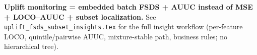 
\noindent\textbf{Uplift monitoring = embedded batch FSDS + AUUC instead of MSE + LOCO--AUUC + subset localization.}
See \verb|uplift_fsds_subset_insights.tex| for the full insight workflow (per-feature LOCO, quintile/pairwise AUUC, mixture-stable path, business rules; no hierarchical tree).
